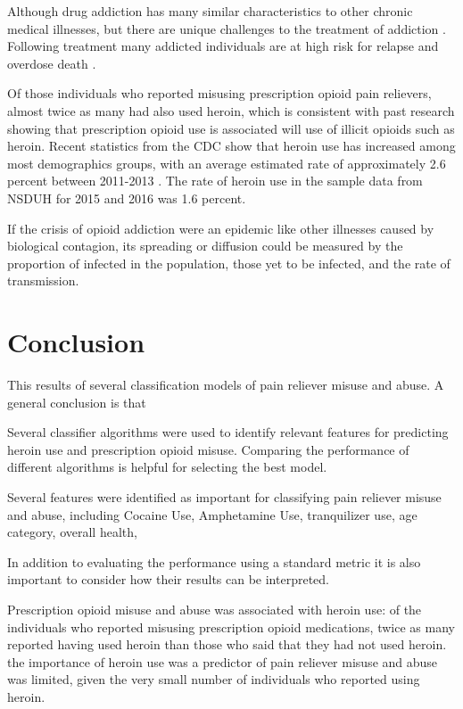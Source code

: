 \documentclass[sigconf]{acmart}
\begin{document}
Although drug addiction has many similar characteristics 
to other chronic medical illnesses, but there are unique challenges to the 
treatment of addiction \cite{marsch12, swendson16}. 
Following treatment many addicted individuals are at high 
risk for relapse and overdose death \cite{shaham03}.

Of those individuals who reported misusing prescription opioid pain relievers, 
almost twice as many had also used heroin, which is  consistent with past
research showing that prescription opioid use is associated will use of illicit 
opioids such as heroin. Recent statistics from the CDC show that heroin use has 
increased among most demographics groups, with an average estimated rate  of 
approximately 2.6 percent between 2011-2013 \cite{cdc16}. The rate of heroin use
in the sample data from NSDUH for 2015 and 2016 was 1.6 percent. 

If the crisis of opioid addiction were an epidemic like other illnesses caused 
by biological contagion, its spreading or diffusion could be measured by the 
proportion of infected in the population, those yet to be infected, and the 
rate of transmission. 

\section{Conclusion}

This results of several classification models of 
pain reliever misuse and abuse. A general conclusion is that 

Several classifier algorithms were used to identify relevant features for 
predicting heroin use and prescription opioid misuse. Comparing the performance 
of different algorithms is helpful for  selecting the best model. 

Several features were identified as important for classifying pain reliever
misuse and abuse, including Cocaine Use, Amphetamine Use, tranquilizer use,
age category, overall health,

In addition to evaluating the performance using
a standard metric it is also important to consider how their results 
can be interpreted.

Prescription opioid misuse and abuse was associated with heroin use: of 
the individuals who reported misusing prescription opioid medications, twice 
as many reported having used heroin than those who said that they had not used 
heroin. the importance of heroin use was a predictor of pain reliever misuse and
abuse was limited, given the very small number of individuals who reported 
using heroin.
\end{document}
